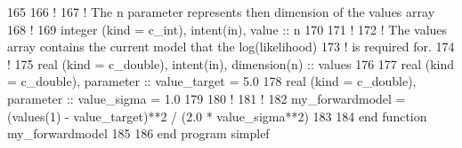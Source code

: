 \begin{DoxyCodeInclude}
165 
166   \textcolor{comment}{!}
167   \textcolor{comment}{! The n parameter represents then dimension of the values array}
168   \textcolor{comment}{!}
169   \textcolor{keywordtype}{integer (kind = c\_int)}, \textcolor{keywordtype}{intent(in)}, \textcolor{keywordtype}{value} :: n
170 
171   \textcolor{comment}{!}
172   \textcolor{comment}{! The values array contains the current model that the log(likelihood)}
173   \textcolor{comment}{! is required for.}
174   \textcolor{comment}{!}
175   \textcolor{keywordtype}{real (kind = c\_double)}, \textcolor{keywordtype}{intent(in)}, \textcolor{keywordtype}{dimension(n)} :: values
176 
177   \textcolor{keywordtype}{real (kind = c\_double)}, \textcolor{keywordtype}{parameter} :: value\_target = 5.0
178   \textcolor{keywordtype}{real (kind = c\_double)}, \textcolor{keywordtype}{parameter} :: value\_sigma = 1.0
179 
180   \textcolor{comment}{!}
181   \textcolor{comment}{!}
182   my\_forwardmodel = (values(1) - value\_target)**2 / (2.0 * value\_sigma**2)
183   
184 \textcolor{keyword}{end function }my\_forwardmodel
185  
186 \textcolor{keyword}{end program }simplef
\end{DoxyCodeInclude}
 